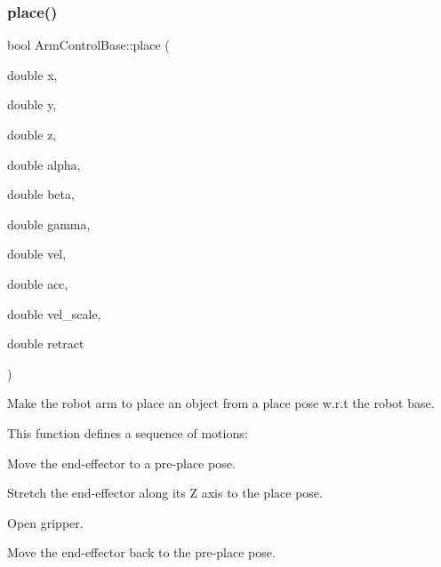 \subsubsection{\texorpdfstring{place()}{place()}\hspace{0.1cm}{\footnotesize\ttfamily [1/2]}}
{\footnotesize\ttfamily bool Arm\+Control\+Base\+::place (\begin{DoxyParamCaption}\item[{double}]{x,  }\item[{double}]{y,  }\item[{double}]{z,  }\item[{double}]{alpha,  }\item[{double}]{beta,  }\item[{double}]{gamma,  }\item[{double}]{vel,  }\item[{double}]{acc,  }\item[{double}]{vel\+\_\+scale,  }\item[{double}]{retract }\end{DoxyParamCaption})\hspace{0.3cm}{\ttfamily [virtual]}}



Make the robot arm to place an object from a place pose w.\+r.\+t the robot base. 

This function defines a sequence of motions\+:
\begin{DoxyEnumerate}
\item Move the end-\/effector to a pre-\/place pose.
\item Stretch the end-\/effector along its Z axis to the place pose.
\item Open gripper.
\item Move the end-\/effector back to the pre-\/place pose.
\end{DoxyEnumerate}


